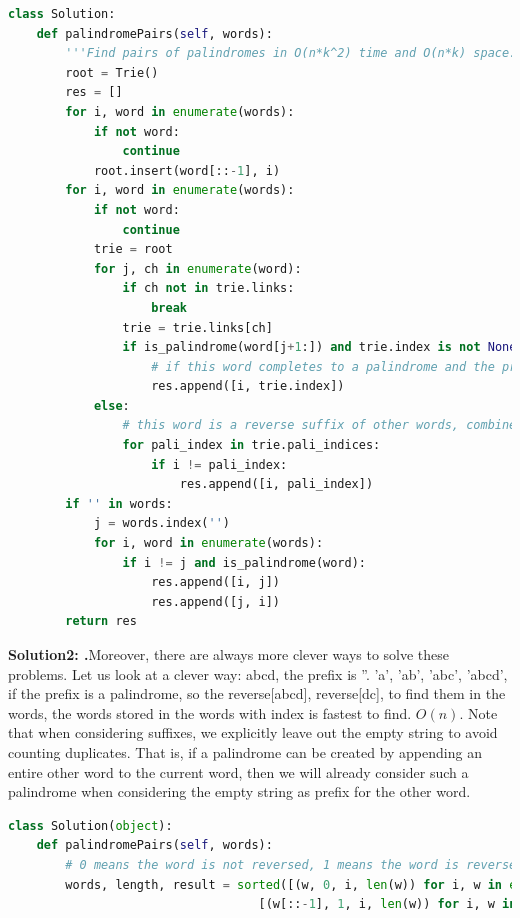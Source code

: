 \documentclass[data-structure.tex]{subfiles}
\begin{document}
\begin{examples}
\begin{lstlisting}[language = Python]
class Solution:
    def palindromePairs(self, words):
        '''Find pairs of palindromes in O(n*k^2) time and O(n*k) space.'''
        root = Trie()
        res = []
        for i, word in enumerate(words):
            if not word:
                continue
            root.insert(word[::-1], i)
        for i, word in enumerate(words):
            if not word:
                continue
            trie = root
            for j, ch in enumerate(word):
                if ch not in trie.links:
                    break
                trie = trie.links[ch]
                if is_palindrome(word[j+1:]) and trie.index is not None and trie.index != i:
                    # if this word completes to a palindrome and the prefix is a word, complete it
                    res.append([i, trie.index])
            else:
                # this word is a reverse suffix of other words, combine with those that complete to a palindrome
                for pali_index in trie.pali_indices:
                    if i != pali_index:
                        res.append([i, pali_index])
        if '' in words:
            j = words.index('')
            for i, word in enumerate(words):
                if i != j and is_palindrome(word):
                    res.append([i, j])
                    res.append([j, i])
        return res
\end{lstlisting}
\textbf{Solution2: .}Moreover, there are always more clever ways to solve these problems. Let us look at a clever way:
 abcd, the prefix is ''. 'a', 'ab', 'abc', 'abcd', if the prefix is a palindrome, so the reverse[abcd], reverse[dc], to find them in the words, the words stored in the words with index is fastest to find. $O(n)$. Note that when considering suffixes, we explicitly leave out the empty string to avoid counting duplicates. That is, if a palindrome can be created by appending an entire other word to the current word, then we will already consider such a palindrome when considering the empty string as prefix for the other word.
 \begin{lstlisting}[language = Python]
 class Solution(object):
    def palindromePairs(self, words):
        # 0 means the word is not reversed, 1 means the word is reversed
        words, length, result = sorted([(w, 0, i, len(w)) for i, w in enumerate(words)] +
                                   [(w[::-1], 1, i, len(w)) for i, w in enumerate(words)]), len(words) * 2, []


\end{lstlisting}
\end{examples}
\end{document}
